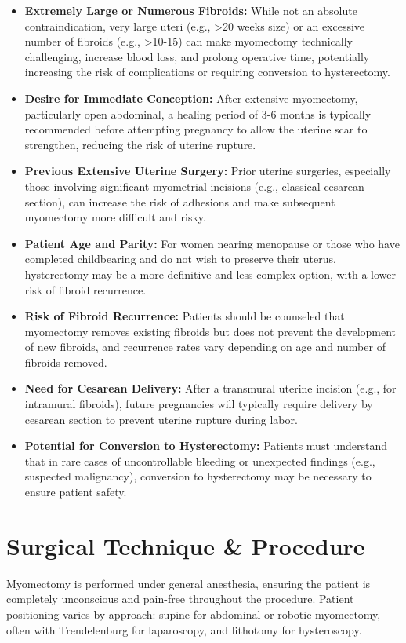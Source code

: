 \begin{itemize}
  \item \textbf{Extremely Large or Numerous Fibroids:} While not an absolute contraindication, very large uteri (e.g., >20 weeks size) or an excessive number of fibroids (e.g., >10-15) can make myomectomy technically challenging, increase blood loss, and prolong operative time, potentially increasing the risk of complications or requiring conversion to hysterectomy.
  
  \item \textbf{Desire for Immediate Conception:} After extensive myomectomy, particularly open abdominal, a healing period of 3-6 months is typically recommended before attempting pregnancy to allow the uterine scar to strengthen, reducing the risk of uterine rupture.
  
  \item \textbf{Previous Extensive Uterine Surgery:} Prior uterine surgeries, especially those involving significant myometrial incisions (e.g., classical cesarean section), can increase the risk of adhesions and make subsequent myomectomy more difficult and risky.
  
  \item \textbf{Patient Age and Parity:} For women nearing menopause or those who have completed childbearing and do not wish to preserve their uterus, hysterectomy may be a more definitive and less complex option, with a lower risk of fibroid recurrence.
  
  \item \textbf{Risk of Fibroid Recurrence:} Patients should be counseled that myomectomy removes existing fibroids but does not prevent the development of new fibroids, and recurrence rates vary depending on age and number of fibroids removed.
  
  \item \textbf{Need for Cesarean Delivery:} After a transmural uterine incision (e.g., for intramural fibroids), future pregnancies will typically require delivery by cesarean section to prevent uterine rupture during labor.
  
  \item \textbf{Potential for Conversion to Hysterectomy:} Patients must understand that in rare cases of uncontrollable bleeding or unexpected findings (e.g., suspected malignancy), conversion to hysterectomy may be necessary to ensure patient safety.
\end{itemize}

\section*{Surgical Technique \& Procedure}
Myomectomy is performed under general anesthesia, ensuring the patient is completely unconscious and pain-free throughout the procedure. Patient positioning varies by approach: supine for abdominal or robotic myomectomy, often with Trendelenburg for laparoscopy, and lithotomy for hysteroscopy.

